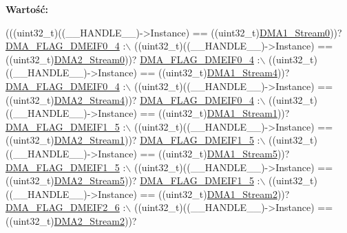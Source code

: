 {\bfseries Wartość\+:}
\begin{DoxyCode}
(((uint32\_t)((\_\_HANDLE\_\_)->Instance) == ((uint32\_t)\hyperlink{group___peripheral__declaration_ga61247dd5d594289c404dd8774202dfd8}{DMA1\_Stream0}))? 
      \hyperlink{group___d_m_a__flag__definitions_gaee0e6da831d62bc84e9e28e59b8e9ede}{DMA\_FLAG\_DMEIF0\_4} :\(\backslash\)
 ((uint32\_t)((\_\_HANDLE\_\_)->Instance) == ((uint32\_t)\hyperlink{group___peripheral__declaration_ga3a2efe5fd7a7a79be3b08a1670bbd016}{DMA2\_Stream0}))? 
      \hyperlink{group___d_m_a__flag__definitions_gaee0e6da831d62bc84e9e28e59b8e9ede}{DMA\_FLAG\_DMEIF0\_4} :\(\backslash\)
 ((uint32\_t)((\_\_HANDLE\_\_)->Instance) == ((uint32\_t)\hyperlink{group___peripheral__declaration_ga87df45f4b82e0b3a8c1b17f1a77aecdb}{DMA1\_Stream4}))? 
      \hyperlink{group___d_m_a__flag__definitions_gaee0e6da831d62bc84e9e28e59b8e9ede}{DMA\_FLAG\_DMEIF0\_4} :\(\backslash\)
 ((uint32\_t)((\_\_HANDLE\_\_)->Instance) == ((uint32\_t)\hyperlink{group___peripheral__declaration_gae32674772021620800275dd3b6d62c2f}{DMA2\_Stream4}))? 
      \hyperlink{group___d_m_a__flag__definitions_gaee0e6da831d62bc84e9e28e59b8e9ede}{DMA\_FLAG\_DMEIF0\_4} :\(\backslash\)
 ((uint32\_t)((\_\_HANDLE\_\_)->Instance) == ((uint32\_t)\hyperlink{group___peripheral__declaration_gaf7d82f110f19982d483eebc465d222b2}{DMA1\_Stream1}))? 
      \hyperlink{group___d_m_a__flag__definitions_gaae665bbda7f888f0b8ac3d10688bfc5d}{DMA\_FLAG\_DMEIF1\_5} :\(\backslash\)
 ((uint32\_t)((\_\_HANDLE\_\_)->Instance) == ((uint32\_t)\hyperlink{group___peripheral__declaration_gae96f15d34d3c41c16fce69bc2878151a}{DMA2\_Stream1}))? 
      \hyperlink{group___d_m_a__flag__definitions_gaae665bbda7f888f0b8ac3d10688bfc5d}{DMA\_FLAG\_DMEIF1\_5} :\(\backslash\)
 ((uint32\_t)((\_\_HANDLE\_\_)->Instance) == ((uint32\_t)\hyperlink{group___peripheral__declaration_gac3abc20f80e25c19b02104ad34eae652}{DMA1\_Stream5}))? 
      \hyperlink{group___d_m_a__flag__definitions_gaae665bbda7f888f0b8ac3d10688bfc5d}{DMA\_FLAG\_DMEIF1\_5} :\(\backslash\)
 ((uint32\_t)((\_\_HANDLE\_\_)->Instance) == ((uint32\_t)\hyperlink{group___peripheral__declaration_gac40f58718761251875b5a897287efd83}{DMA2\_Stream5}))? 
      \hyperlink{group___d_m_a__flag__definitions_gaae665bbda7f888f0b8ac3d10688bfc5d}{DMA\_FLAG\_DMEIF1\_5} :\(\backslash\)
 ((uint32\_t)((\_\_HANDLE\_\_)->Instance) == ((uint32\_t)\hyperlink{group___peripheral__declaration_gad0e2140b8eeec3594035f1a7bf2a7250}{DMA1\_Stream2}))? 
      \hyperlink{group___d_m_a__flag__definitions_ga8963d8e64fa5610d7617d8fe81c76704}{DMA\_FLAG\_DMEIF2\_6} :\(\backslash\)
 ((uint32\_t)((\_\_HANDLE\_\_)->Instance) == ((uint32\_t)\hyperlink{group___peripheral__declaration_ga71bb410664b861ff0520f08976e24ee1}{DMA2\_Stream2}))? 

\end{DoxyCode}
